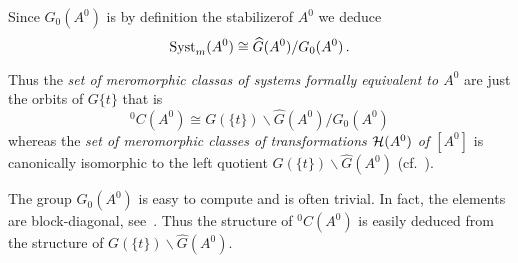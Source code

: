 \begin{lem}
  Since $G_0(A^0)$ is by definition the stabilizer\PROBLEM[correct?] of $A^0$ we
  deduce
  \[
    \operatorname{Syst}_m(A^0)\cong \widehat G(A^0)/G_0(A^0) \,.
  \]
  \begin{s-cor}
    Thus the \emph{set of meromorphic classas of systems formally equivalent
      to $A^0$} are just the orbits of $G\{t\}$ that is
    \[
      {}^0C(A^0)\cong G(\!\{t\}\!)\backslash\hat G(A^0)/G_0(A^0)
    \]
    whereas the \emph{set of meromorphic classes of transformations $\mathcal{H}(A^0)$
    of $[A^0]$} is canonically isomorphic to the left quotient
    $G(\!\{t\}\!)\backslash\hat G(A^0)$ (cf.\ \cite[Lem.1.17]{thboalch}).
  \end{s-cor}
\end{lem}
\begin{comment}
  \begin{proof}
    See
    \begin{itemize}
      \item~\cite[6]{thboalch}: in the case $G_0(A^0)=T$
    \end{itemize}
  \end{proof}
\end{comment}

The group $G_0(A^0)$ is easy to compute and is often trivial. In fact, the
elements are block-diagonal, see~\cite[77]{Loday2014}.
Thus the structure of ${}^0C(A^0)$ is easily deduced from the structure of
$G(\!\{t\}\!)\backslash\hat G(A^0)$.

